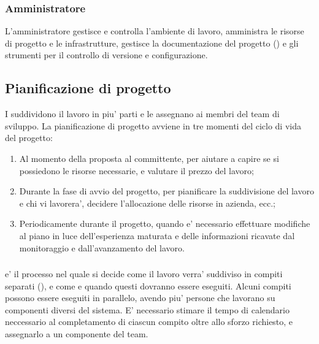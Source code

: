 \subsubsection{Amministratore}
L'amministratore gestisce e controlla l'ambiente di lavoro, amministra le risorse di progetto e le infrastrutture, gestisce la documentazione del progetto () e gli strumenti per il controllo di versione e configurazione.

\subsection{Pianificazione di progetto}
I  suddividono il lavoro in piu' parti e le assegnano ai membri del team di sviluppo. La pianificazione di progetto avviene in tre momenti del ciclo di vida del progetto:
\begin{enumerate}
	\item Al momento della proposta al committente, per aiutare a capire se si possiedono le risorse necessarie, e valutare il prezzo del lavoro;
	\item Durante la fase di avvio del progetto, per pianificare la suddivisione del lavoro e chi vi lavorera', decidere l'allocazione delle risorse in azienda, ecc.;
	\item Periodicamente durante il progetto, quando e' necessario effettuare modifiche al piano in luce dell'esperienza maturata e delle informazioni ricavate dal monitoraggio e dall'avanzamento del lavoro.
\end{enumerate}

\subsubsection{}
 e' il processo nel quale si decide come il lavoro verra' suddiviso in compiti separati (), e come e quando questi dovranno essere eseguiti. Alcuni compiti possono essere eseguiti in parallelo, avendo piu' persone che lavorano su componenti diversi del sistema. E' necessario stimare il tempo di calendario neccessario al completamento di ciascun compito oltre allo sforzo richiesto, e assegnarlo a un componente del team.



